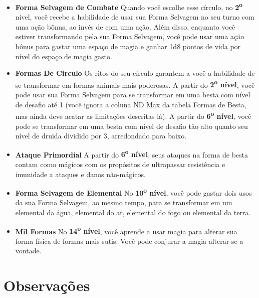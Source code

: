 \documentclass[a4paper,12p]{book}
\begin{document}
{			\begin{multicols}{2}
			\begin{itemize}
				\item \textbf{Forma Selvagem de Combate} Quando você escolhe esse círculo, no \textbf{2\textsuperscript{o}} nível, você recebe a habilidade de usar sua Forma Selvagem no seu turno com uma ação bônus, ao invés de com uma ação.
				Além disso, enquanto você estiver transformando pela sua Forma Selvagem, você pode usar uma ação bônus para gastar uma espaço de magia e ganhar 1d8 pontos de vida por nível do espaço de magia gasto.
				
				\item \textbf{Formas De Circulo} Os ritos do seu círculo garantem a você a habilidade de se transformar em formas animais mais poderosas. A partir do \textbf{2\textsuperscript{o} nível}, você pode usar sua Forma Selvagem para se transformar em uma besta com nível de desafio até 1 (você ignora a coluna ND Max da tabela Formas de Besta, mas ainda deve acatar as limitações descritas lá).
				A partir do \textbf{6\textsuperscript{o} nível}, você pode se transformar em uma besta com nível de desafio tão alto quanto seu nível de druida dividido por 3, arredondado para baixo.
				
				\item \textbf{Ataque Primordial} A partir do \textbf{6\textsuperscript{o} nível}, seus ataques na forma de besta contam como mágicos com os propósitos de ultrapassar resistência e imunidade a ataques e danos não-mágicos.
				
				\item \textbf{Forma Selvagem de Elemental} No \textbf{10\textsuperscript{o} nível}, você pode gastar dois usos da sua Forma Selvagem, ao mesmo tempo, para se transformar em um elemental da água, elemental do ar, elemental do fogo ou elemental da terra.
				
				\item \textbf{Mil Formas} No \textbf{14\textsuperscript{o} nível}, você aprende a usar magia para alterar sua forma física de formas mais sutis. Você pode conjurar a magia alterar-se a vontade.
			\end{itemize}
			
			
			\vfill\null
		\end{multicols}}
	
	\section{Observações}
	
\end{document}
